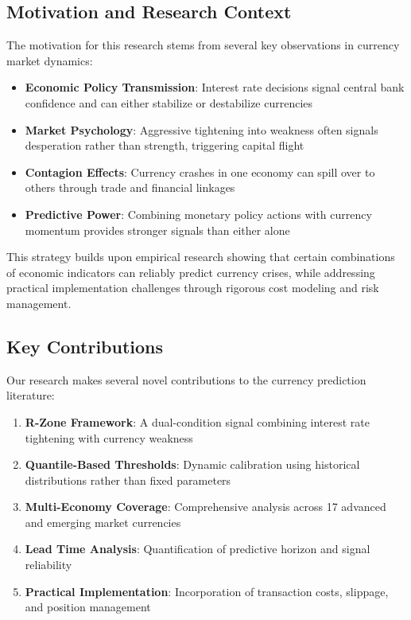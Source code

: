 \documentclass[twocolumn,ieee]{arithmaxresearch}
\begin{document}
\subsection{Motivation and Research Context}

The motivation for this research stems from several key observations in currency market dynamics:

\begin{itemize}
    \item \textbf{Economic Policy Transmission}: Interest rate decisions signal central bank confidence and can either stabilize or destabilize currencies~\cite{bernanke2005monetary}
    \item \textbf{Market Psychology}: Aggressive tightening into weakness often signals desperation rather than strength, triggering capital flight~\cite{calvo2001capital}
    \item \textbf{Contagion Effects}: Currency crashes in one economy can spill over to others through trade and financial linkages~\cite{forbes2002crash}
    \item \textbf{Predictive Power}: Combining monetary policy actions with currency momentum provides stronger signals than either alone~\cite{frankel2005preventing}
\end{itemize}

This strategy builds upon empirical research showing that certain combinations of economic indicators can reliably predict currency crises, while addressing practical implementation challenges through rigorous cost modeling and risk management.

\subsection{Key Contributions}

Our research makes several novel contributions to the currency prediction literature:

\begin{enumerate}
    \item \textbf{R-Zone Framework}: A dual-condition signal combining interest rate tightening with currency weakness
    \item \textbf{Quantile-Based Thresholds}: Dynamic calibration using historical distributions rather than fixed parameters
    \item \textbf{Multi-Economy Coverage}: Comprehensive analysis across 17 advanced and emerging market currencies
    \item \textbf{Lead Time Analysis}: Quantification of predictive horizon and signal reliability
    \item \textbf{Practical Implementation}: Incorporation of transaction costs, slippage, and position management
\end{enumerate}
\end{document}

